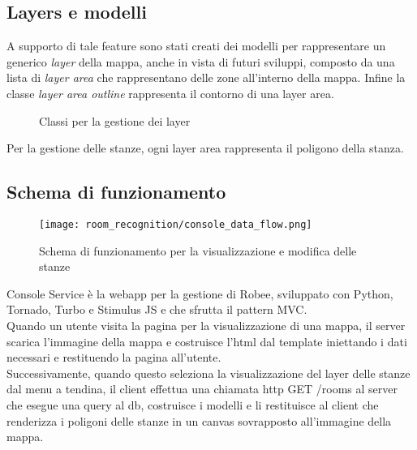 \subsection{Layers e modelli}
A supporto di tale feature sono stati creati dei modelli per rappresentare un generico \textit{layer} della mappa, anche in vista di futuri sviluppi, composto da una lista di \textit{layer area} che rappresentano delle zone all'interno della mappa. Infine la classe \textit{layer area outline} rappresenta il contorno di una layer area.
\begin{figure}[H]
  \centering
  \caption{Classi per la gestione dei layer}
\end{figure}
\noindent
Per la gestione delle stanze, ogni layer area rappresenta il poligono della stanza.

\subsection{Schema di funzionamento}
\begin{figure}[H]
  \centering
  \texttt{[image: room\_recognition/console\_data\_flow.png]}
  \caption{Schema di funzionamento per la visualizzazione e modifica delle stanze}
\end{figure}
Console Service è la webapp per la gestione di Robee, sviluppato con Python, Tornado, Turbo e Stimulus JS e che sfrutta il pattern MVC.\\
Quando un utente visita la pagina per la visualizzazione di una mappa, il server scarica l'immagine della mappa e costruisce l'html dal template iniettando i dati necessari e restituendo la pagina all'utente.\\ Successivamente, quando questo seleziona la visualizzazione del layer delle stanze dal menu a tendina, il client effettua una chiamata http GET /rooms al server che esegue una query al db, costruisce i modelli e li restituisce al client che renderizza i poligoni delle stanze in un canvas sovrapposto all'immagine della mappa.\\
